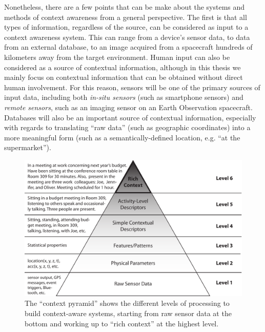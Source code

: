 Nonetheless, there are a few points that can be make about the systems and methods of context awareness from a general perspective. The first is that all types of information, regardless of the source, can be considered as input to a context awareness system. This can range from a device's sensor data, to data from an external database, to an image acquired from a spacecraft hundreds of kilometers away from the target environment. Human input can also be considered as a source of contextual information, although in this thesis we mainly focus on contextual information that can be obtained without direct human involvement. For this reason, sensors will be one of the primary sources of input data, including both \emph{in-situ sensors} (such as smartphone sensors) and \emph{remote sensors}, such as an imaging sensor on an Earth Observation spacecraft. Databases will also be an important source of contextual information, especially with regards to translating ``raw data'' (such as geographic coordinates) into a more meaningful form (such as a semantically-defined location, e.g. ``at the supermarket'').
%
\begin{figure}[t]
  \begin{center}
    \includegraphics[width=1.0\textwidth]{Images/ContextPyramid4}
  \end{center}
  \caption[The Context Pyramid]{The ``context pyramid'' shows the different levels of processing to build context-aware systems, starting from raw sensor data at the bottom and working up to ``rich context'' at the highest level.}
  \label{fig:context_pyramid}
\end{figure}
%


